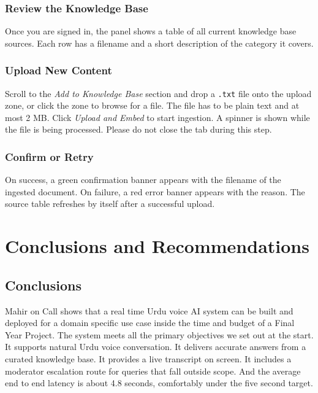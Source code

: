 \documentclass[12pt,a4paper]{report}
\begin{document}
\subsubsection{Review the Knowledge Base}
Once you are signed in, the panel shows a table of all current knowledge
base sources. Each row has a filename and a short description of the
category it covers.

\subsubsection{Upload New Content}
Scroll to the \textit{Add to Knowledge Base} section and drop a
\texttt{.txt} file onto the upload zone, or click the zone to browse for
a file. The file has to be plain text and at most 2 MB. Click
\textit{Upload and Embed} to start ingestion. A spinner is shown while
the file is being processed. Please do not close the tab during this
step.

\subsubsection{Confirm or Retry}
On success, a green confirmation banner appears with the filename of the
ingested document. On failure, a red error banner appears with the
reason. The source table refreshes by itself after a successful upload.

\newpage
\section{Conclusions and Recommendations}

\subsection{Conclusions}

Mahir on Call shows that a real time Urdu voice AI system can be built
and deployed for a domain specific use case inside the time and budget of
a Final Year Project. The system meets all the primary objectives we set
out at the start. It supports natural Urdu voice conversation. It
delivers accurate answers from a curated knowledge base. It provides a
live transcript on screen. It includes a moderator escalation route for
queries that fall outside scope. And the average end to end latency is
about 4.8 seconds, comfortably under the five second target.
\end{document}
